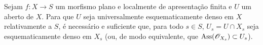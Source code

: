 \begin{proposition}[11.10.10]
\label{IV.11.10.10}
Sejam $f:X\to S$
um morfismo plano
e localmente de
apresentação finita
e $U$ um aberto
de $X$. Para que
$U$ seja
universalmente
esquematicamente
denso em $X$
relativamente a $S$,
é necessário e
suficiente que, para
todo $s\in S$,
$U_s=U\cap X_s$
seja
esquematicamente
denso em $X_s$
(ou, de modo
equivalente, que
$\operatorname{Ass}
(\mathscr{O}_{X_s})
\subset U_s$).
\end{proposition}
